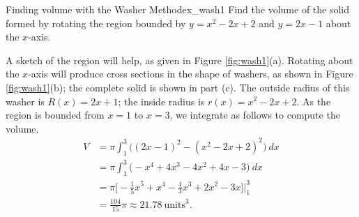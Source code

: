 \begin{example}{Finding volume with the Washer Method}{ex_wash1}{
Find the volume of the solid formed by rotating the region bounded by $y=x^2-2x+2$ and $y=2x-1$ about the $x$-axis.}
\end{example}


\begin{solution}
{A sketch of the region will help, as given in Figure \ref{fig:wash1}(a).
Rotating about the $x$-axis will produce cross sections in the shape of washers, as shown in Figure \ref{fig:wash1}(b); the complete solid is shown in part (c). The outside radius of this washer is $R(x) = 2x+1$; the inside radius is $r(x) = x^2-2x+2$. As the region is bounded from $x=1$ to $x=3$, we integrate as follows to compute the volume.
\begin{align*}
V &= \pi\int_1^3 \Big((2x-1)^2-(x^2-2x+2)^2\Big)\ dx \\
		&= \pi\int_1^3 \big(-x^4+4x^3-4x^2+4x-3\big)\ dx \\
		&= \pi\Big[-\frac{1}{5}x^5+x^4-\frac43x^3+2x^2-3x\Big]\Big|_1^3 \\
		&=\frac{104}{15}\pi \approx 21.78\ \text{units}^3.
\end{align*}	
\baselineskip	


}
\end{solution}

